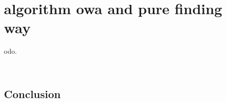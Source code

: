 %
%
\let\textcircled=\pgftextcircled
\chapter{algorithm owa and pure finding way}
\label{chap:??}

odo.

\
\
\
\
\
\









\section{Conclusion}